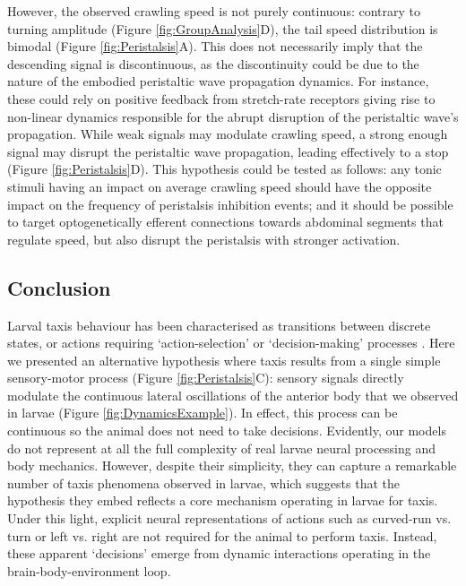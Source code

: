 \documentclass[11pt,a4paper]{article}
\newcommand{\todoKL}[1]{\todo[author=KL,color=blue!40, size=\tiny,inline]{#1}}
\newcommand{\todoBW}[1]{\todo[author=BW,color=orange, size=\tiny,inline]{#1}}
\begin{document}
However, the observed crawling speed is not purely continuous: contrary to turning amplitude (Figure \ref{fig:GroupAnalysis}D), the tail speed distribution is bimodal (Figure \ref{fig:Peristalsis}A).
 This does not necessarily imply that the descending signal is discontinuous, as the discontinuity could be due to the nature of the embodied peristaltic wave propagation dynamics. For instance, these could rely on positive feedback from stretch-rate receptors \citep{ross2015model} giving rise to non-linear dynamics responsible for the abrupt disruption of the peristaltic wave's propagation. While weak signals may modulate crawling speed, a strong enough signal may disrupt the peristaltic wave propagation, leading effectively to a stop (Figure \ref{fig:Peristalsis}D).
  This hypothesis could be tested as follows: any tonic stimuli having an impact on average crawling speed should have the opposite impact on the frequency of peristalsis inhibition events; and it should be possible to target optogenetically efferent connections towards abdominal segments that regulate speed, but also disrupt the peristalsis with stronger activation.

\subsection{Conclusion}
Larval taxis behaviour has been characterised as transitions between discrete states, or actions \citep{green1983organization,sawin1994sensorimotor, cobbwhatandhow1999, gomez2012active}  requiring ‘action-selection’ or ‘decision-making’ processes \citep{gomez2014multilevel}. Here we presented an alternative hypothesis where taxis results from a single simple sensory-motor process (Figure \ref{fig:Peristalsis}C): sensory signals directly modulate the continuous lateral oscillations of the anterior body that we observed in larvae (Figure \ref{fig:DynamicsExample}). In effect, this process can be continuous so the animal does not need to take decisions. 
Evidently, our models do not represent at all the full complexity of real larvae neural processing and body mechanics. However, despite their simplicity, they can capture a remarkable number of taxis phenomena observed in larvae, which suggests that the hypothesis they embed reflects a core mechanism operating in larvae for taxis. Under this light, explicit neural representations of actions such as curved-run vs. turn or left vs. right are not required for the animal to perform taxis. Instead, these apparent `decisions' emerge from dynamic interactions operating in the brain-body-environment loop.
\end{document}
